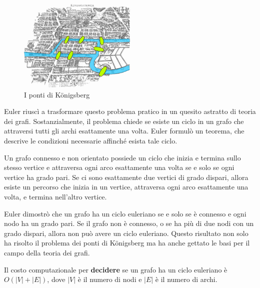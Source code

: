 \begin{figure}[ht]
    \centering
    \includegraphics[width=0.5\textwidth]{img/Konigsberg_bridges.png}
    \caption{I ponti di Königsberg}
    \label{fig:konigsberg_bridges}
\end{figure}

Euler riuscì a trasformare questo problema pratico in un quesito astratto di teoria dei grafi. Sostanzialmente, il problema chiede se esiste un ciclo in un grafo che attraversi tutti gli archi esattamente una volta. Euler formulò un teorema, che descrive le condizioni necessarie affinché esista tale ciclo.

\begin{tcolorbox}[title=Teorema di Euler]
    Un grafo connesso e non orientato possiede un ciclo che inizia e termina sullo
    stesso vertice e attraversa ogni arco esattamente una volta se e solo se ogni
    vertice ha grado pari. Se ci sono esattamente due vertici di grado dispari, allora
    esiste un percorso che inizia in un vertice, attraversa ogni arco esattamente una volta,
    e termina nell'altro vertice.
\end{tcolorbox}
Euler dimostrò che un grafo ha un ciclo euleriano se e solo se è connesso e
ogni nodo ha un grado pari. Se il grafo non è connesso, o se ha più di due nodi
con un grado dispari, allora non può avere un ciclo euleriano. Questo risultato non
solo ha risolto il problema dei ponti di Königsberg ma ha anche gettato le basi per il
campo della teoria dei grafi.

Il costo computazionale per \textbf{decidere} se un grafo ha un ciclo euleriano è
$O(|V|+|E|)$, dove $|V|$ è il numero di nodi e $|E|$ è il numero di archi. 

